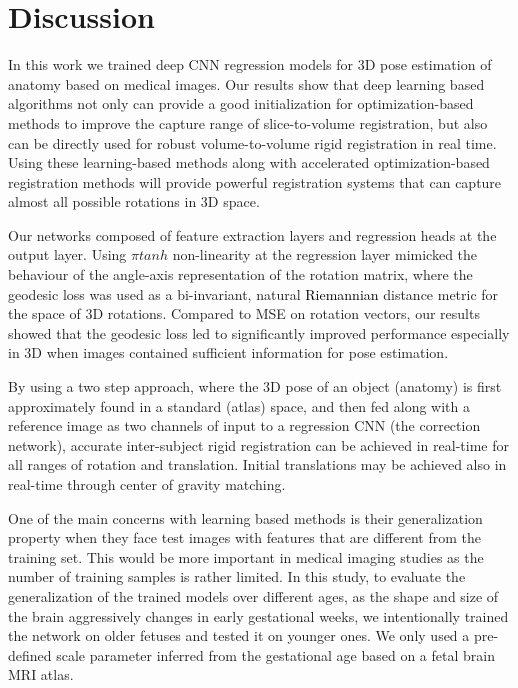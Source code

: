 \documentclass[journal,transmag]{IEEEtran}
\begin{document}
\section{Discussion}
\label{sec:discussion}
In this work we trained deep CNN regression models for 3D pose estimation of anatomy based on medical images. Our results show that deep learning based algorithms not only can provide a good initialization for optimization-based methods to improve the capture range of slice-to-volume registration, but also can be directly used for robust volume-to-volume rigid registration in real time. Using these learning-based methods along with accelerated optimization-based registration methods will provide powerful registration systems that can capture almost all possible rotations in 3D space.

Our networks composed of feature extraction layers and regression heads at the output layer. Using $\pi tanh$ non-linearity at the regression layer mimicked the behaviour of the angle-axis representation of the rotation matrix, where the geodesic loss was used as a bi-invariant, natural \textcolor{black}{Riemannian} distance metric for the space of 3D rotations. Compared to MSE on rotation vectors, our results showed that the geodesic loss led to significantly improved performance especially in 3D when images contained sufficient information for pose estimation.%

By using a two step approach, where the 3D pose of an object (anatomy) is first approximately found in a standard (atlas) space, and then fed along with a reference image as two channels of input to a regression CNN (the correction network), accurate inter-subject rigid registration can be achieved in real-time for all ranges of rotation and translation. Initial translations may be achieved also in real-time through center of gravity matching.

One of the main concerns with learning based methods is their generalization property when they face test images with features that are different from the training set. This would be more important in medical imaging studies as the number of training samples is rather limited. In this study, to evaluate the generalization of the trained models over different ages, as the shape and size of the brain aggressively changes in early gestational weeks, we intentionally trained the network on older fetuses and tested it on younger ones. We only used a pre-defined scale parameter inferred from the gestational age based on a fetal brain MRI atlas.
\end{document}
